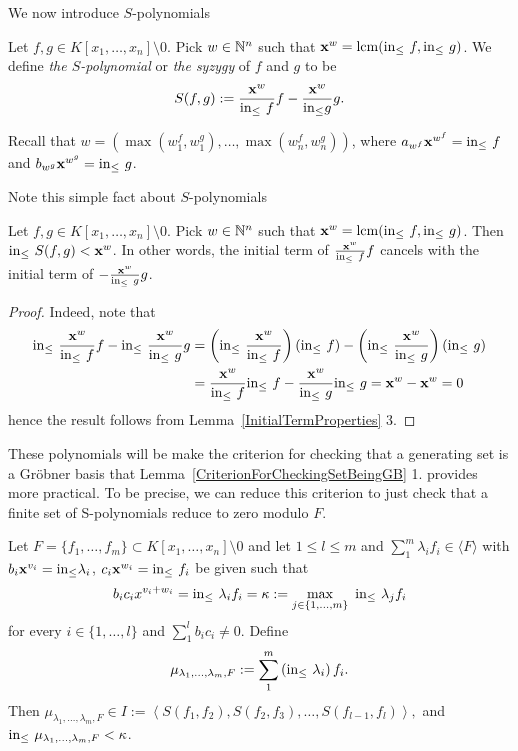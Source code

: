 We now introduce $S$-polynomials
\begin{definition}
    Let $f,g\in K[x_1,\dots,x_n]\setminus 0$. Pick $w\in \mathbb{N}^n$ such that $\mathbf{x}^w = \mathrm{lcm}(\mathrm{in}_\leq\ f,\mathrm{in}_\leq\ g)$. We define \textit{the $S$-polynomial} or \textit{the syzygy} of $f$ and $g$ to be 
    $$S(f,g):= \frac{\mathbf{x}^w}{\mathrm{in}_\leq\ f }f-\frac{\mathbf{x}^w}{\mathrm{in}_\leq 
 g }g.$$
\end{definition}
\begin{remark}
    Recall that $w = \left(\max\left(w^f_1,w^g_1\right),\dots,\max\left(w^f_n,w^g_n\right) \right)$, where $a_{w^f}\mathbf{x}^{w^f} = \inn\ f$ and $b_{w^g}\mathbf{x}^{w^g}= \inn\ g$.
\end{remark}
Note this simple fact about $S$-polynomials
\begin{lemma}\label{LeadingTermsOfTermsInSPolynomialVanish}
    Let $f,g\in K[x_1,\dots,x_n]\setminus 0$. Pick $w\in \mathbb{N}^n$ such that $\mathbf{x}^w = \mathrm{lcm}(\mathrm{in}_\leq\ f,\mathrm{in}_\leq\ g)$. Then $\mathrm{in}_\leq\ S(f,g)< \mathbf{x}^w$. In other words, the initial term of $\frac{\mathbf{x}^w}{\mathrm{in}_\leq\ f}f$ cancels with the initial term of $-\frac{\mathbf{x}^w}{\mathrm{in}_\leq\ g}g$.
\end{lemma}
\begin{proof}
    Indeed, note that  
    \begin{align*} 
        \inn\ \frac{\mathbf{x}^w}{\inn\ f}f -\inn\ \frac{\mathbf{x}^w}{\inn\ g}g &= \left(\inn\ \frac{\mathbf{x}^w}{\inn\ f}\right)\left(\inn\ f\right) - \left(\inn\ \frac{\mathbf{x}^w}{\inn\ g}\right)\left(\inn\ g\right)\\ 
        &= \frac{\mathbf{x}^w}{\inn\ f}\inn\ f - \frac{\mathbf{x}^w}{\inn\ g}\inn\ g 
        = \mathbf{x}^w-\mathbf{x}^w= 0 
    \end{align*}
    hence the result follows from Lemma~\ref{InitialTermProperties} 3.
\end{proof}
These polynomials will be make the criterion for checking that a generating set is a Gröbner basis that Lemma~\ref{CriterionForCheckingSetBeingGB} 1. provides more practical. To be precise, we can reduce this criterion to just check that a finite set of S-polynomials reduce to zero modulo $F$.
\begin{lemma}\label{TechnicalLemmaForBuchbergerCriterion}
    Let $F=\{f_1,\dots,f_m\}\subset K[x_1,\dots,x_n]\setminus 0$ and let $1\leq l \leq m$ and $\sum_1^m\lambda_if_i \in \langle F\rangle$ with 
    $b_{i}\mathbf{x}^{v_i}=\mathrm{in}_\leq \lambda_i$, $c_{i} \mathbf{x}^{w_i}=\mathrm{in}_\leq\ f_i$ be given such that $$b_ic_ix^{v_i+w_i}=\mathrm{in}_\leq \ \lambda_if_i =\kappa := \max_{j\in\{1,\dots,m\}}\ \mathrm{in}_\leq\ \lambda_jf_i$$
    for every $i\in\{1,\dots,l\}$ and $\sum_1^l b_ic_i \neq 0$. Define $$\mu_{\lambda_1,\dots,\lambda_m,F} := \sum_1^m \left(\mathrm{in}_\leq\ \lambda_i\right)f_i.$$
    Then $\mu_{\lambda_1,\dots,\lambda_m,F} \in I:=\left\langle S(f_1,f_2),S(f_2,f_3),\dots,S(f_{l-1},f_l)\right\rangle,$ and $\mathrm{in}_\leq\ \mu_{\lambda_1,\dots,\lambda_m,F} < \kappa$. 
\end{lemma}
